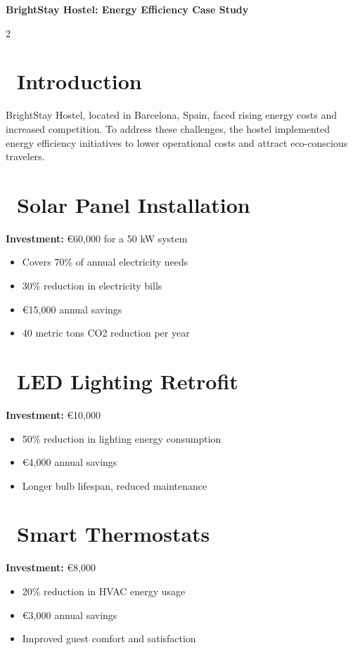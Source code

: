 \documentclass[12pt,a4paper]{article}
\begin{document}
\thispagestyle{empty}

\begin{center}
\textcolor{hostelblue}{\huge\textbf{BrightStay Hostel: Energy Efficiency Case Study}}
\end{center}

\vspace{0.5cm}

\begin{multicols}{2}

\section*{\faLightbulb\ Introduction}
BrightStay Hostel, located in Barcelona, Spain, faced rising energy costs and increased competition. To address these challenges, the hostel implemented energy efficiency initiatives to lower operational costs and attract eco-conscious travelers.

\section*{\faSolarPanel\ Solar Panel Installation}
\textbf{Investment:} €60,000 for a 50 kW system
\begin{itemize}
\item Covers 70\% of annual electricity needs
\item 30\% reduction in electricity bills
\item €15,000 annual savings
\item 40 metric tons CO2 reduction per year
\end{itemize}

\section*{\faLightbulb\ LED Lighting Retrofit}
\textbf{Investment:} €10,000
\begin{itemize}
\item 50\% reduction in lighting energy consumption
\item €4,000 annual savings
\item Longer bulb lifespan, reduced maintenance
\end{itemize}

\section*{\faTemperatureHigh\ Smart Thermostats}
\textbf{Investment:} €8,000
\begin{itemize}
\item 20\% reduction in HVAC energy usage
\item €3,000 annual savings
\item Improved guest comfort and satisfaction
\end{itemize}


\end{multicols}
\end{document}

